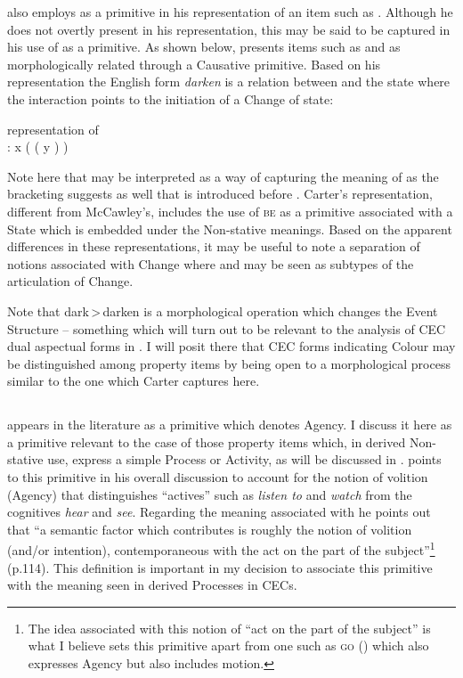 \citet{Carter1976} also employs \CAUSE as a primitive in his
representation of an item such as \DARKEN.  Although he does not
overtly present \BECOME in his representation, this may be said to be
captured in his use of \CHANGE as a primitive.  As shown below,
\citet{Carter1976} presents items such as \DARK and \DARKEN as
morphologically related through a Causative primitive.  Based on his
representation the English form \textit{darken} is a relation between \CAUSE
and the state \BEDARK where the interaction points to the initiation
of a Change of state:

\ea%
\label{ex:4:14}
 representation of \DARKEN\\
\DARKEN: x \CAUSE ( ( y \BEDARK) \CHANGE) 
\z

Note here that \CHANGE may be interpreted as a way of capturing the
meaning of \BECOME as the bracketing suggests as well that \CHANGE is
introduced before \CAUSE.  Carter’s representation, different from
McCawley’s, includes the use of \textsc{be} as a primitive associated with a
State which is embedded under the Non-stative meanings.  Based on the
apparent differences in these representations, it may be useful to
note a separation of notions associated with Change where \CAUSE and
\BECOME may be seen as subtypes of the articulation of Change.

Note that dark\,>\,darken is a morphological operation which changes the
Event Structure -- something which will turn out to be relevant to the
analysis of CEC dual aspectual forms in . I will posit
there that CEC forms indicating Colour may be distinguished among
property items by being open to a morphological process similar to the
one which Carter captures here.

\subsection{\DO}\label{sec:4.3.2}

\DO appears in the literature as a primitive which denotes Agency.  I
discuss it here as a primitive relevant to the case of those property
items which, in derived Non-stative use, express a simple Process or
Activity, as will be discussed in . \citet{Dowty1979}
points to this primitive in his overall discussion to account for the
notion of volition (Agency) that distinguishes “actives” such as
\textit{listen to} and \textit{watch} from the cognitives
\textit{hear} and \textit{see}. Regarding the meaning associated with
\DO he points out that “a semantic factor which \DO contributes is
roughly the notion of volition (and\slash or intention), contemporaneous
with the act on the part of the subject”\footnote{The idea associated
  with this notion of ``act on the part of the subject'' is what I
  believe sets this primitive apart from one such as \textsc{go}
  (\citealt{Jackendoff1972, Jackendoff1996}) which also expresses Agency but
  also includes motion.} (p.114).  This definition is important in
my decision to associate this primitive with the meaning seen in
derived Processes in CECs.

